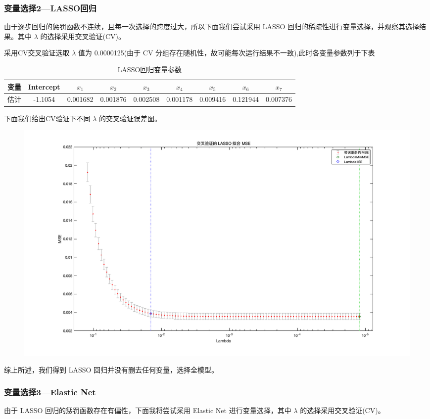 \documentclass[11pt]{article}
\begin{document}
\subsubsection*{变量选择2---LASSO回归}
由于逐步回归的惩罚函数不连续，且每一次选择的跨度过大，所以下面我们尝试采用 LASSO 回归的稀疏性进行变量选择，并观察其选择结果。其中 $\lambda$ 的选择采用交叉验证(CV)。

采用CV交叉验证选取 $\lambda$ 值为 0.0000125(由于 CV 分组存在随机性，故可能每次运行结果不一致),此时各变量参数列于下表
\begin{table}[H]
	\centering
	\caption{LASSO回归变量参数}
	\label{tab4}
	\begin{tabular}{ccccccccc}
		\hline
		变量& Intercept& $x_1$    & $x_2$    & $x_3$& $x_4$ &   $x_5$    & $x_6$    & $x_7$ \\
		\hline
		估计	& -1.1054    & 0.001682   & 0.001876   & 0.002508    & 0.001178 &0.009416&0.121944&0.007376\\
		\hline
	\end{tabular}
\end{table}
下面我们给出CV验证下不同 $\lambda$ 的交叉验证误差图。
\begin{figure}[H]
\centering
\includegraphics[scale=0.35]{images/LASSO2.png}
\end{figure}
综上所述，我们得到 LASSO 回归并没有删去任何变量，选择全模型。
\subsubsection*{变量选择3---Elastic Net}
由于 LASSO 回归的惩罚函数存在有偏性，下面我将尝试采用 Elastic Net 进行变量选择，其中 $\lambda$ 的选择采用交叉验证(CV)。
\end{document}
